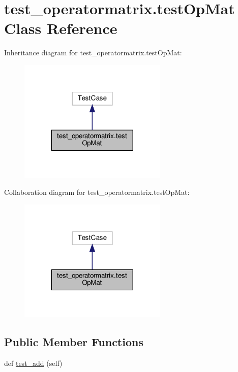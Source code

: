\hypertarget{classtest__operatormatrix_1_1testOpMat}{}\section{test\+\_\+operatormatrix.\+test\+Op\+Mat Class Reference}
\label{classtest__operatormatrix_1_1testOpMat}


Inheritance diagram for test\+\_\+operatormatrix.\+test\+Op\+Mat\+:
\nopagebreak
\begin{figure}[H]
\begin{center}
\leavevmode
\includegraphics[width=200pt]{classtest__operatormatrix_1_1testOpMat__inherit__graph}
\end{center}
\end{figure}


Collaboration diagram for test\+\_\+operatormatrix.\+test\+Op\+Mat\+:
\nopagebreak
\begin{figure}[H]
\begin{center}
\leavevmode
\includegraphics[width=200pt]{classtest__operatormatrix_1_1testOpMat__coll__graph}
\end{center}
\end{figure}
\subsection*{Public Member Functions}
\begin{DoxyCompactItemize}
\item 
def \hyperlink{classtest__operatormatrix_1_1testOpMat_a8123d8a83970cc4a0a7d90b5cbd05355}{test\+\_\+add} (self)
\end{DoxyCompactItemize}


